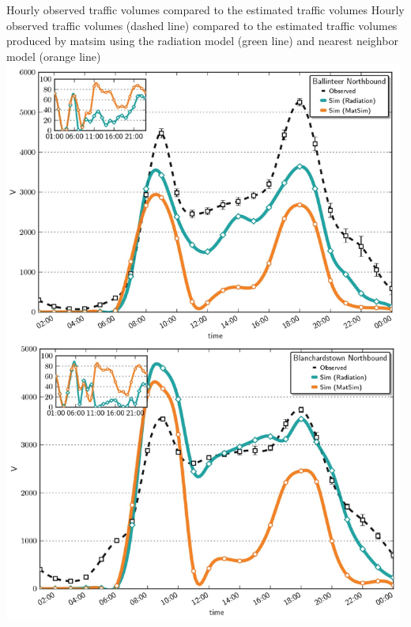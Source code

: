 \createfigure%
{Hourly observed traffic volumes compared to the estimated traffic volumes}%
{Hourly observed traffic volumes (dashed line) compared to the estimated traffic volumes produced by \gls{matsim} using the radiation model (green line) and nearest neighbor model (orange line)}%
{\label{fig:dublin1}}%
{\includegraphics[width=0.99\textwidth, angle=0]{using/figures/dublin1.png}}%
{}






